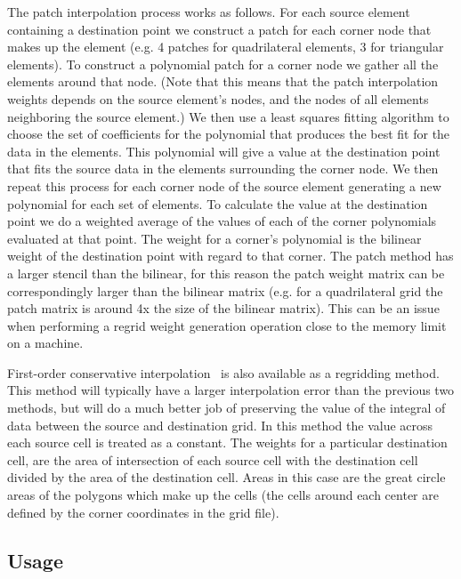 The patch interpolation process works as follows. 
For each source element containing a destination point
we construct a patch for each corner node that makes up the element (e.g. 4 patches for 
quadrilateral elements, 3 for triangular elements). To construct a polynomial patch for
 a corner node we gather all the elements around that node. 
(Note that this means that the patch interpolation weights depends on the source 
element's nodes, and the nodes of all elements neighboring the source element.)  
We then use a least squares fitting algorithm to choose the set of coefficients 
for the polynomial that produces the best fit for the data in the elements. 
This polynomial will give a value at the destination point that fits the source data 
in the elements surrounding the corner node. We then repeat this process for each 
corner node of the source element generating a new polynomial for each set of elements.  
To calculate the value at the destination point we do a weighted average of the values 
of each of the corner polynomials evaluated at that point. The weight for a corner's 
polynomial is the bilinear weight of the destination point with regard to that corner.  
The patch method has a larger stencil than the bilinear, for this reason the patch weight matrix can be correspondingly larger
than the bilinear matrix (e.g. for a quadrilateral grid the patch matrix is around 4x the size of
the bilinear matrix). This can be an issue when performing a regrid weight generation operation close to the memory
limit on a machine. 



First-order conservative interpolation~\cite{ConservativeOrder1} is also available as a regridding method. This method will typically have  
a larger interpolation error than the previous two methods, but will do a much better job of preserving the value of the 
integral of data between the source and destination grid. In this method the value across each source cell
is treated as a constant. The weights for a particular destination cell, are the area of intersection of each 
source cell with the destination cell divided by the area of the destination cell.
Areas in this case are the great circle 
areas of the polygons which make up the cells (the cells around each center are defined by the corner coordinates 
in the grid file). 

\subsection{Usage}

